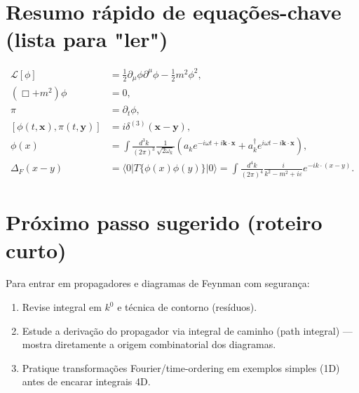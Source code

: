 \documentclass[12pt,a4paper]{article}
\begin{document}
\section{Resumo rápido de equações-chave (lista para "ler")}
\begin{align}
\mathcal{L}[\phi] &= \tfrac12\partial_\mu\phi\partial^\mu\phi - \tfrac12 m^2\phi^2, \\
(\Box+m^2)\phi &=0, \\
\pi &= \partial_t\phi, \\
[\phi(t,\mathbf{x}),\pi(t,\mathbf{y})] &= i\delta^{(3)}(\mathbf{x}-\mathbf{y}), \\
\phi(x) &= \int\frac{d^3k}{(2\pi)^3}\frac{1}{\sqrt{2\omega_k}}(a_ke^{-i\omega t+i\mathbf{k}\cdot\mathbf{x}}+a^\dagger_k e^{i\omega t-i\mathbf{k}\cdot\mathbf{x}}), \\
\Delta_F(x-y) &= \langle0|T\{\phi(x)\phi(y)\}|0\rangle = \int\frac{d^4k}{(2\pi)^4}\frac{i}{k^2-m^2+i\varepsilon}e^{-ik\cdot(x-y)}.
\end{align}

\section*{Próximo passo sugerido (roteiro curto)}
Para entrar em propagadores e diagramas de Feynman com segurança: 
\begin{enumerate}
  \item Revise integral em $k^0$ e técnica de contorno (resíduos). 
  \item Estude a derivação do propagador via integral de caminho (path integral) — mostra diretamente a origem combinatorial dos diagramas.
  \item Pratique transformações Fourier/time-ordering em exemplos simples (1D) antes de encarar integrais 4D.
\end{enumerate}
\end{document}
